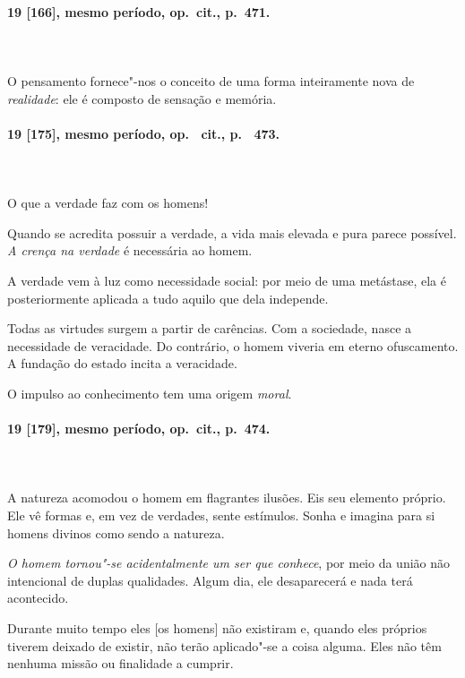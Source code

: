 \pagebreak
\paragraph*{19 [166], mesmo período, op.~cit., p.~471.}
\ \\
\ \\

O pensamento fornece"-nos o conceito de uma forma inteiramente nova de
\textit{realidade}: ele é composto de sensação e memória.

\pagebreak
\paragraph*{19 [175], mesmo período, op.~ cit., p.~ 473.}
\ \\
\ \\

O que a verdade faz com os homens!

Quando se acredita possuir a verdade, a vida mais elevada e pura parece
possível. \textit{A crença na verdade} é necessária ao homem.

A verdade vem à luz como necessidade social: por meio de uma metástase,
ela é posteriormente aplicada a tudo aquilo que dela independe.

Todas as virtudes surgem a partir de carências. Com a sociedade, nasce a
necessidade de veracidade. Do contrário, o homem viveria em eterno
ofuscamento. A fundação do estado incita a veracidade. 

O impulso ao conhecimento tem uma origem \textit{moral}.

\pagebreak
\paragraph*{19 [179], mesmo período, op.~cit., p.~474.}
\ \\
\ \\ 

A natureza acomodou o homem em flagrantes ilusões. Eis seu elemento
próprio. Ele vê formas e, em vez de verdades, sente estímulos. Sonha e
imagina para si homens divinos como sendo a natureza.

\textit{O homem tornou"-se acidentalmente um ser que conhece}, por meio
da união não intencional de duplas qualidades. Algum dia, ele
desaparecerá e nada terá acontecido.

Durante muito tempo eles [os homens] não existiram e, quando eles
próprios tiverem deixado de existir, não terão aplicado"-se a coisa
alguma. Eles não têm nenhuma missão ou finalidade a cumprir.

